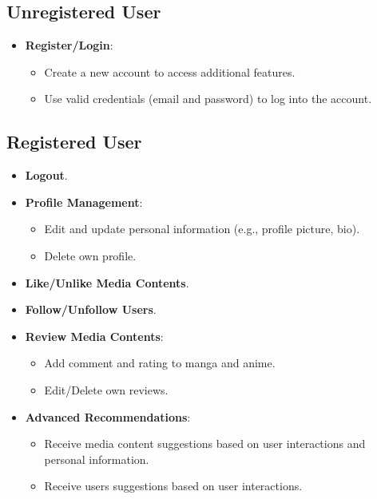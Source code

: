 \subsection*{Unregistered User}

\begin{itemize}
    \item \textbf{Register/Login}:
    \begin{itemize}
        \item Create a new account to access additional features.
        \item Use valid credentials (email and password) to log into the account.
    \end{itemize}
\end{itemize}

\subsection*{Registered User}

\begin{itemize}
    \item \textbf{Logout}.
    
    \item \textbf{Profile Management}:
    \begin{itemize}
        \item Edit and update personal information (e.g., profile picture, bio).
        \item Delete own profile.
    \end{itemize}
    
    \item \textbf{Like/Unlike Media Contents}.
    
    \item \textbf{Follow/Unfollow Users}.
    
    \item \textbf{Review Media Contents}:
    \begin{itemize}
        \item Add comment and rating to manga and anime.
        \item Edit/Delete own reviews.
    \end{itemize}
    
    \item \textbf{Advanced Recommendations}:
    \begin{itemize}
        \item Receive media content suggestions based on user interactions and personal information.
        \item Receive users suggestions based on user interactions.
    \end{itemize}
\end{itemize}

